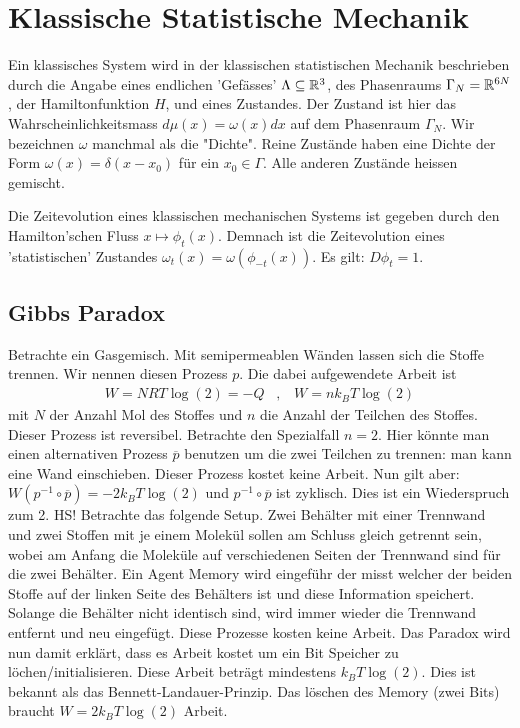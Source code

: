 \section{Klassische Statistische Mechanik}

\setcounter{subsection}{-1}

Ein klassisches System wird in der klassischen statistischen Mechanik
beschrieben durch die Angabe eines endlichen 'Gefässes' $\Lambda \subseteq
\mathbb{R}^3$, des Phasenraums $\Gamma_N = \mathbb{R}^{6N}$, der Hamiltonfunktion $H$, und
eines Zustandes. Der Zustand ist hier das Wahrscheinlichkeitsmass
$d \mu(x) = \omega(x) dx$ auf dem Phasenraum $\Gamma_N$. Wir bezeichnen
$\omega$ manchmal als die "Dichte". Reine Zustände haben eine Dichte der
Form $\omega(x) = \delta(x-x_0)$ für ein $x_0 \in \Gamma$. Alle anderen
Zustände heissen gemischt.

Die Zeitevolution eines klassischen mechanischen Systems ist gegeben durch
den Hamilton'schen Fluss $x \mapsto \phi_t(x)$. Demnach ist die Zeitevolution
eines 'statistischen' Zustandes $\omega_t(x) = \omega(\phi_{-t}(x))$.
Es gilt: $D \phi_t = 1$.

\subsection{Gibbs Paradox}

Betrachte ein Gasgemisch. Mit semipermeablen Wänden lassen sich die Stoffe
trennen. Wir nennen diesen Prozess $p$. Die dabei aufgewendete Arbeit ist
\begin{align*}
    W = N R T \log(2) = -Q
    \hspace{10pt} , \hspace{10pt}
    W = n k_B T \log(2)
\end{align*}
mit $N$ der Anzahl Mol des Stoffes und $n$ die Anzahl der Teilchen des Stoffes.
Dieser Prozess ist reversibel. Betrachte den Spezialfall $n=2$. Hier könnte man
einen alternativen Prozess $\overline{p}$ benutzen um die zwei Teilchen zu trennen:
man kann eine Wand einschieben. Dieser Prozess kostet keine Arbeit. Nun gilt
aber: $W(p^{-1} \circ \overline{p}) = - 2 k_B T \log(2)$ und $p^{-1} \circ
\overline{p}$ ist zyklisch. Dies ist ein Wiederspruch zum 2. HS! Betrachte
das folgende Setup. Zwei Behälter mit einer Trennwand und zwei Stoffen mit je
einem Molekül sollen am Schluss gleich getrennt sein, wobei am Anfang die
Moleküle auf verschiedenen Seiten der Trennwand sind für die zwei Behälter.
Ein Agent Memory wird eingeführ der misst welcher der beiden Stoffe auf der
linken Seite des Behälters ist und diese Information speichert. Solange die
Behälter nicht identisch sind, wird immer wieder die Trennwand entfernt und
neu eingefügt. Diese Prozesse kosten keine Arbeit. Das Paradox wird nun damit
erklärt, dass es Arbeit kostet um ein Bit Speicher zu löchen/initialisieren.
Diese Arbeit beträgt mindestens $k_B T \log(2)$. Dies ist bekannt als das
Bennett-Landauer-Prinzip. Das löschen des Memory (zwei Bits) braucht
$W = 2 k_B T \log(2)$ Arbeit.

